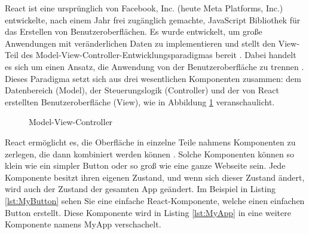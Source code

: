\documentclass[
  ngerman,
  a4paper,  %
  twoside,  %
  bibliography=totoc,
  headsepline,
  cleardoublepage=empty,
  parskip=half,
  draft=false
]{scrbook}
\begin{document}
React ist eine ursprünglich von  Facebook, Inc. (heute Meta Platforms, Inc.) entwickelte, nach einem Jahr frei zugänglich gemachte, JavaScript Bibliothek für das Erstellen von Benutzeroberflächen. Es wurde entwickelt, um große Anwendungen mit veränderlichen Daten zu implementieren und stellt den \glqq View\grqq-Teil des Model-View-Controller-Entwicklungsparadigmas bereit \cite{krill2023react}. Dabei handelt es sich um einen Ansatz, die Anwendung von der Benutzeroberfläche zu trennen \cite{deacon-model-view-controller2009}. Dieses Paradigma setzt sich aus drei wesentlichen Komponenten zusammen: dem Datenbereich (Model), der Steuerungslogik (Controller) und der von React erstellten Benutzeroberfläche (View), wie in Abbildung \ref{fig:MVCdiag} veranschaulicht.
\begin{figure}
  \centering
  \caption{Model-View-Controller \cite{inbook}}
  \label{fig:MVCdiag}

\end{figure}



React ermöglicht es, die Oberfläche in einzelne Teile nahmens Komponenten zu zerlegen, die dann kombiniert werden können \cite{react2023}. Solche Komponenten können so klein wie ein simpler Button oder so groß wie eine ganze Webseite sein. Jede Komponente besitzt ihren eigenen Zustand, und wenn sich dieser Zustand ändert, wird auch der Zustand der gesamten App geändert. Im Beispiel in Listing \ref{lst:MyButton} sehen Sie eine einfache React-Komponente, welche einen einfachen Button erstellt. Diese Komponente wird in Listing \ref{lst:MyApp} in eine weitere Komponente namens MyApp verschachelt.



\end{document}
